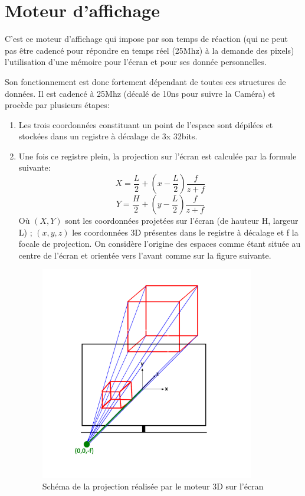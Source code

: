 \documentclass[10pt,a4paper]{report}
\begin{document}
\section{Moteur d'affichage}

C'est ce moteur d'affichage qui impose par son temps de réaction (qui ne peut pas être cadencé pour répondre en temps réel (25Mhz) à la demande des pixels) l'utilisation d'une mémoire pour l'écran et pour ses donnée personnelles.

Son fonctionnement est donc fortement dépendant de toutes ces structures de données. Il est cadencé à 25Mhz (décalé de 10ns pour suivre la Caméra) et procède par plusieurs étapes:
\begin{enumerate}
\item Les trois coordonnées constituant un point de l'espace sont dépilées et stockées dans un registre à décalage de 3x 32bits.
\item Une fois ce registre plein, la projection sur l'écran est calculée par la formule suivante:
\[ X = \frac{L}{2} + \left(x-\frac{L}{2}\right)\frac{f}{z+f} \]
\[ Y = \frac{H}{2} + \left(y-\frac{L}{2}\right)\frac{f}{z+f} \]
Où $\left(X,Y\right)$ sont les coordonnées projetées sur l'écran (de hauteur H, largeur L) ; $\left(x,y,z\right)$ les coordonnées 3D présentes dans le registre à décalage et f la focale de projection. On considère l'origine des espaces comme étant située au centre de l'écran et orientée vers l'avant comme sur la figure suivante.

\begin{figure}[!h]
\centering
\includegraphics[width=265pt]{gfx/proj.png}
\caption{Schéma de la projection réalisée par le moteur 3D sur l'écran}
\end{figure}


\end{enumerate}
\end{document}
